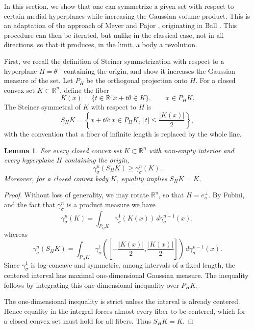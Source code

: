 \documentclass[12pt,oneside,reqno]{amsart}
\numberwithin{equation}{section}
\newtheorem{lemma}[theorem]{Lemma}
\theoremstyle{remark}
\newcommand{\R}{\mathbb R}
\newcommand{\dd}{\,d}
\begin{document}
In this section, we show that one can symmetrize a given set with respect to certain medial hyperplanes while increasing the Gaussian volume product. This is an adaptation of the approach of Meyer and Pajor \cite{MeyerPajorBlaschke}, originating in Ball \cite{Ball-thesis}. This procedure can then be iterated, but unlike in the classical case, not in all directions, so that it produces, in the limit, a body a revolution. 

First, we recall the definition of  Steiner symmetrization with respect to a hyperplane $H=\theta^\perp$ containing the origin, and show it increases the Gaussian measure of the set. Let $P_H$ be the orthogonal projection onto $H$. For a closed convex set $K\subset\R^n$, define the fiber
\[
        K(x)=\{t\in\R:x+t\theta\in K\},\qquad x\in P_HK.
\]
The Steiner symmetral of $K$ with respect to $H$ is
\[
        S_HK=\left\{x+t\theta:x\in P_HK,\ |t|\le \frac{|K(x)|}{2}\right\},
\]
with the convention that a fiber of infinite length is replaced by the whole line.
\begin{lemma}\label{lem:gauss-steiner}
For every closed convex set $K\subset\R^n$ with non-empty interior and every hyperplane $H$ containing the origin,
\[
        \gamma_\sigma^n(S_HK)\ge\gamma_\sigma^n(K).
\]
Moreover, for a closed convex body $K$, equality implies $S_HK=K$.
\end{lemma}

\begin{proof}
Without loss of generality, we may rotate $\R^n$, so that $H=e_n^\perp$.  By Fubini, and the fact that $\gamma_\sigma^n$ is a product measure we have
\[
        \gamma_\sigma^n(K)=\int_{P_HK}\gamma_\sigma^1(K(x))\dd\gamma_\sigma^{n-1}(x),
\]
whereas
\[
        \gamma_\sigma^n(S_HK)=\int_{P_HK}\gamma_\sigma^1\left(\left[-\frac{|K(x)|}{2},\frac{|K(x)|}{2}\right]\right)\dd\gamma_\sigma^{n-1}(x).
\]
Since $\gamma_\sigma^1$ is log-concave and symmetric,  among intervals of a fixed length, the centered interval has maximal one-dimensional Gaussian measure. The inequality follows by integrating this one-dimensional inequality over $P_HK$.

The one-dimensional inequality is strict unless the interval is already centered. Hence equality in the integral forces almost every fiber to be centered, which for a closed convex set must hold for all fibers. Thus $S_HK=K$.
\end{proof}
\end{document}
